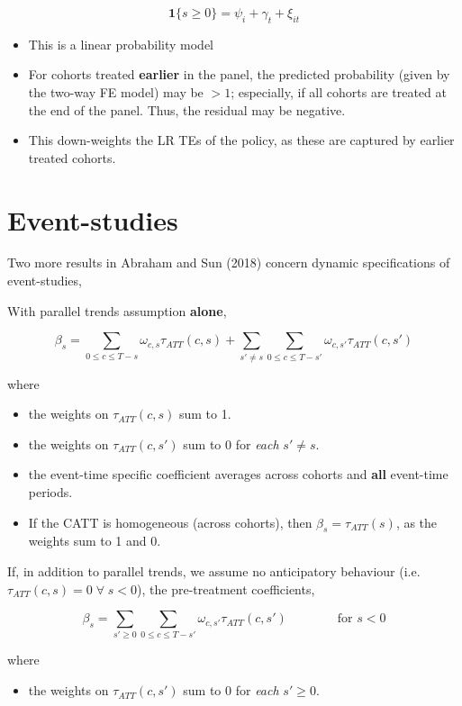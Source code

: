 \documentclass[
  letterpaper,
  DIV=11,
  numbers=noendperiod]{scrreprt}
\providecommand{\tightlist}{%
  \setlength{\itemsep}{0pt}\setlength{\parskip}{0pt}}\usepackage{longtable,booktabs,array}
\theoremstyle{definition}
\theoremstyle{remark}
\begin{document}
\[
\mathbf{1}\{s\geq 0\} = \psi_i + \gamma_t + \xi_{it}
\]

\begin{itemize}
\tightlist
\item
  This is a linear probability model
\item
  For cohorts treated \textbf{earlier} in the panel, the predicted
  probability (given by the two-way FE model) may be \(>1\); especially,
  if all cohorts are treated at the end of the panel. Thus, the residual
  may be negative.
\item
  This down-weights the LR TEs of the policy, as these are captured by
  earlier treated cohorts.
\end{itemize}

\section{Event-studies}\label{event-studies-1}

Two more results in Abraham and Sun (2018) concern dynamic
specifications of event-studies,

With parallel trends assumption \textbf{alone},

\[
\beta_s = \sum_{0\leq c \leq T-s}\omega_{c,s} \tau_{ATT}(c,s) + \sum_{s'\neq s}\sum_{0\leq c \leq T-s'}\omega_{c,s'} \tau_{ATT}(c,s')
\]

where

\begin{itemize}
\tightlist
\item
  the weights on \(\tau_{ATT}(c,s)\) sum to 1.
\item
  the weights on \(\tau_{ATT}(c,s')\) sum to 0 for \emph{each}
  \(s'\neq s\).
\item
  the event-time specific coefficient averages across cohorts and
  \textbf{all} event-time periods.
\item
  If the CATT is homogeneous (across cohorts), then
  \(\beta_s = \tau_{ATT}(s)\), as the weights sum to 1 and 0.
\end{itemize}

If, in addition to parallel trends, we assume no anticipatory behaviour
(i.e.~\(\tau_{ATT}(c,s)=0\;\forall\;s<0\)), the pre-treatment
coefficients,

\[
\beta_s = \sum_{s'\geq 0}\sum_{0\leq c \leq T-s'}\omega_{c,s'} \tau_{ATT}(c,s') \qquad\qquad \text{for }s<0
\]

where

\begin{itemize}
\tightlist
\item
  the weights on \(\tau_{ATT}(c,s')\) sum to 0 for \emph{each}
  \(s'\geq 0\).
\end{itemize}
\end{document}
